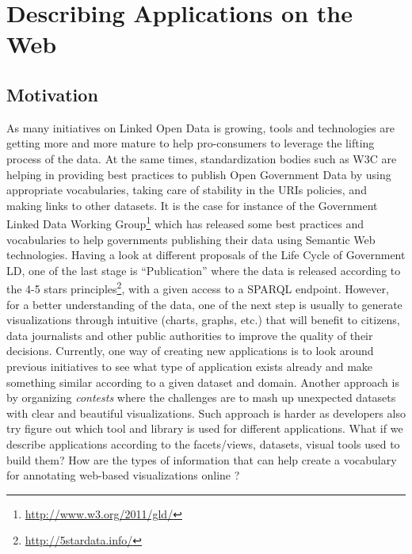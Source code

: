     



\section{Describing Applications on the Web}
 \label{sec:descApps}
 
 \subsection{Motivation}
As many initiatives on Linked Open Data is growing, tools and technologies are getting more and more mature to help pro-consumers to leverage the lifting process of the data. At the same times, standardization bodies such as W3C are helping in providing best practices to publish Open Government Data by using appropriate vocabularies, taking care of stability in the URIs policies, and making links to other datasets. It is the case for instance of the Government Linked Data Working Group\footnote{\url{http://www.w3.org/2011/gld/}} which has released some best practices and vocabularies to help governments publishing their data using Semantic Web technologies. Having a look at different proposals of the Life Cycle of Government LD, one of the last stage is ``Publication'' where the data is released according to the 4-5 stars principles\footnote{\url{http://5stardata.info/}}, with a given access to a SPARQL endpoint. However, for a better understanding of the data, one of the next step is usually to generate visualizations through intuitive (charts, graphs, etc.) that will benefit to citizens, data journalists and other public authorities to improve the quality of their decisions. Currently, one way of creating new applications is to look around previous initiatives to see what type of application exists already and make something similar according to a given dataset and domain. Another approach is by organizing \textit{contests} where the challenges are to mash up unexpected datasets with clear and beautiful visualizations. Such approach is harder as developers also try figure out which tool and library is used for different applications. What if we describe applications according to the facets/views, datasets, visual tools used to build them? How are the types of information that can help create a vocabulary for annotating web-based visualizations online ? 

